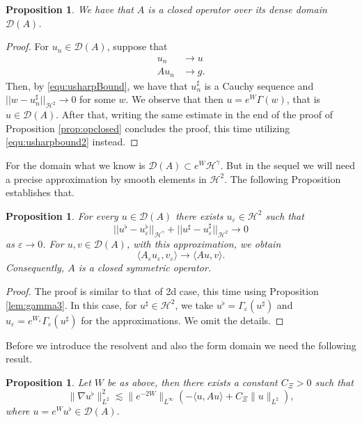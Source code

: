 \documentclass[11pt, oneside]{article}   	%
\newtheorem{proposition}[theorem]{Proposition}
\begin{document}
\begin{proposition}
	We have that $A$ is a closed operator over its dense domain $\mathscr{D}(A)$.
\end{proposition}

\begin{proof}
For  $u_n \in \mathscr{D}(A)$, suppose that
\begin{align*}
u_n & \rightarrow u \\
A u_n & \rightarrow g.
\end{align*} 
Then, by \eqref{equ:usharpBound}, we have that $u_n^\sharp$ is a Cauchy sequence and $||w  - u_n^\sharp||_{\mathscr{H}^2} \rightarrow 0$ for some $w$.  We observe that then $u = e^{W}\Gamma(w)$, that is $u \in \mathscr{D}(A)$.  After that, writing the same estimate in the end of the proof of Proposition \ref{prop:opclosed} concludes the proof, this time utilizing \eqref{equ:usharpbound2} instead.
\end{proof}

For the domain what we know is $\mathscr{D}(A) \subset e^{W} \mathscr{H}^\gamma$.  But in the sequel we will need a precise approximation by smooth elements in $\mathscr{H}^2$.  The following Proposition establishes that.



\begin{proposition}
	For every $u \in \mathscr{D}(A)$ there exists $u_\varepsilon \in \mathscr{H}^2$ such that 
	\[
	|| u^\flat - u_\varepsilon^\flat  ||_{\mathscr{H}^\gamma} + || u^\sharp - u_\varepsilon^\sharp ||_{\mathscr{H}^2} \rightarrow 0
	\]
	as $\varepsilon \rightarrow 0$. For $u, v \in \mathscr{D}(A)$, with this approximation, we obtain
	\[
	\langle A_\varepsilon u_\varepsilon, v_\varepsilon \rangle \rightarrow \langle A u, v \rangle.
	\]
	Consequently, $A$ is a closed symmetric operator.
\end{proposition}

\begin{proof}
	The proof is similar to that of 2d case, this time using Proposition \ref{lem:gamma3}. In this case,  for $u^\sharp \in \mathscr{H}^2$, we take $u^\flat  = \Gamma_\varepsilon(u^\sharp)$ and $u_\varepsilon = e^{W_\varepsilon}\Gamma_\varepsilon(u^\sharp)$ for the approximations.  We omit the details.
\end{proof}

Before we introduce the resolvent and also the form domain we need the following result.

\begin{proposition}
	\label{lem:3dh1}Let $W$ be as above, then there exists a constant $C_{\Xi} >
	0$ such that
	\[ \| \nabla u^{\flat} \|^2_{L^2} \lesssim \| e^{- 2 W} \|_{L^{\infty}} (-
	\langle u, A u \rangle + C_{\Xi} \| u \|_{L^2}), \]
	where $u = e^W u^{\flat} \in \mathscr{D}(A) .$
\end{proposition}
\end{document}
